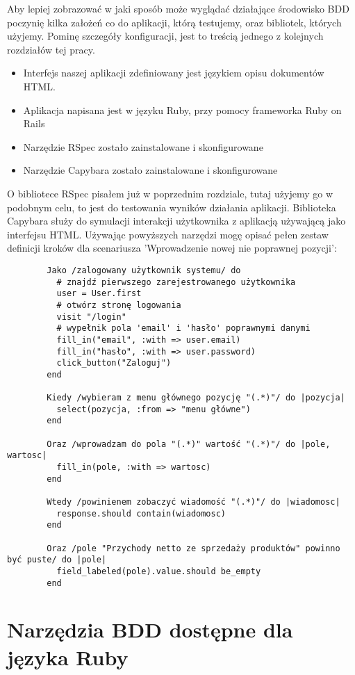       Aby lepiej zobrazować w jaki sposób może wyglądać działające środowisko BDD poczynię kilka założeń co do aplikacji, którą testujemy, oraz bibliotek, których użyjemy. Pominę szczegóły konfiguracji, jest to treścią jednego z kolejnych rozdziałów tej pracy.
      
      \begin{itemize}
        \item Interfejs naszej aplikacji zdefiniowany jest językiem opisu dokumentów HTML.
        \item Aplikacja napisana jest w języku Ruby, przy pomocy frameworka Ruby on Rails
        \item Narzędzie RSpec zostało zainstalowane i skonfigurowane
        \item Narzędzie Capybara zostało zainstalowane i skonfigurowane
      \end{itemize}
      
      O bibliotece RSpec pisałem już w poprzednim rozdziale, tutaj użyjemy go w podobnym celu, to jest do testowania wyników działania aplikacji. Biblioteka Capybara służy do symulacji interakcji użytkownika z aplikacją używającą jako interfejsu HTML. Używając powyższych narzędzi mogę opisać pełen zestaw definicji kroków dla scenariusza 'Wprowadzenie nowej nie poprawnej pozycji':
      
      \begin{verbatim}        
        Jako /zalogowany użytkownik systemu/ do
          # znajdź pierwszego zarejestrowanego użytkownika
          user = User.first
          # otwórz stronę logowania
          visit "/login"
          # wypełnik pola 'email' i 'hasło' poprawnymi danymi
          fill_in("email", :with => user.email)
          fill_in("hasło", :with => user.password)
          click_button("Zaloguj")
        end
        
        Kiedy /wybieram z menu głównego pozycję "(.*)"/ do |pozycja|
          select(pozycja, :from => "menu główne")
        end
        
        Oraz /wprowadzam do pola "(.*)" wartość "(.*)"/ do |pole, wartosc|
          fill_in(pole, :with => wartosc)
        end
        
        Wtedy /powinienem zobaczyć wiadomość "(.*)"/ do |wiadomosc|
          response.should contain(wiadomosc)
        end
        
        Oraz /pole "Przychody netto ze sprzedaży produktów" powinno być puste/ do |pole|
          field_labeled(pole).value.should be_empty
        end
      \end{verbatim}
        
  \section{Narzędzia BDD dostępne dla języka Ruby}

